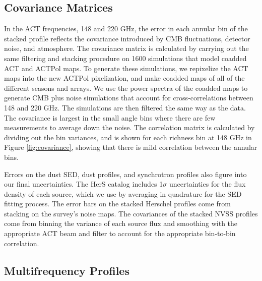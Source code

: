 \documentclass[a4paper,fleqn,usenatbib]{mnras}
\begin{document}
\subsection{Covariance Matrices}

In the ACT frequencies, 148 and 220 GHz, the error in each annular bin of the stacked profile reflects the covariance introduced by CMB fluctuations, detector noise, and atmosphere. 
The covariance matrix is calculated by carrying out the same filtering and stacking procedure on 1600 simulations that model coadded ACT and ACTPol maps.
To generate these simulations, we repixelize the ACT maps into the new ACTPol pixelization, and make coadded maps of all of the different seasons and arrays. 
We use the power spectra of the coadded maps to generate CMB plus noise simulations that account for cross-correlations between 148 and 220 GHz.  
The simulations are then filtered the same way as the data. 
The covariance is largest in the small angle bins where there are few measurements to average down the noise. 
The correlation matrix is calculated by dividing out the bin variances, and is shown for each richness bin at 148 GHz in Figure \ref{fig:covariance}, showing that there is mild correlation between the annular bins.  

Errors on the dust SED, dust profiles, and synchrotron profiles also figure into our final uncertainties.  
The HerS catalog includes 1$\sigma$ uncertainties for the flux density of each source, which we use by averaging in quadrature for the SED fitting process. 
The error bars on the stacked Herschel profiles come from stacking on the survey's noise maps. 
The covariances of the stacked NVSS profiles come from binning the variance of each source flux and smoothing with the appropriate ACT beam and filter to account for the appropriate bin-to-bin correlation.

\subsection{Multifrequency Profiles} \label{sec:multifreqprof}
\end{document}
